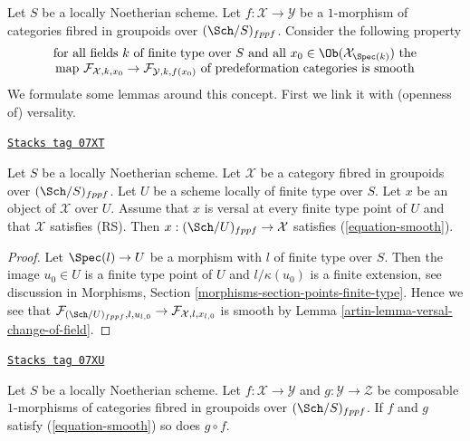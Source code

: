 Let $S$ be a locally Noetherian scheme.
Let $f : \mathcal{X} \to \mathcal{Y}$ be a $1$-morphism of categories
fibred in groupoids over $(\Sch/S)_{fppf}$. Consider the following property
\begin{equation}
\label{equation-smooth}
\begin{matrix}
\text{for all fields }k\text{ of finite type over }S
\text{ and all }x_0 \in \Ob(\mathcal{X}_{\Spec(k)})\text{ the}\\
\text{map }
\mathcal{F}_{\mathcal{X}, k, x_0} \to \mathcal{F}_{\mathcal{Y}, k, f(x_0)}
\text{ of predeformation categories is smooth}
\end{matrix}
\end{equation}
We formulate some lemmas around this concept. First we link it with
(openness of) versality.

\begin{lemma}
\label{artin-lemma-versal-smooth}
\href{https://stacks.math.columbia.edu/tag/07XT}{\texttt{Stacks tag 07XT}}

Let $S$ be a locally Noetherian scheme. Let $\mathcal{X}$ be a category
fibred in groupoids over $(\Sch/S)_{fppf}$. Let $U$ be a scheme locally
of finite type over $S$. Let $x$ be an object of $\mathcal{X}$ over $U$.
Assume that $x$ is versal at every finite type point of $U$ and that
$\mathcal{X}$ satisfies (RS). Then $x : (\Sch/U)_{fppf} \to \mathcal{X}$
satisfies (\ref{equation-smooth}).
\end{lemma}

\begin{proof}

Let $\Spec(l) \to U$ be a morphism with $l$ of finite type over $S$.
Then the image $u_0 \in U$ is a finite type point of $U$ and
$l/\kappa(u_0)$ is a finite extension, see discussion in
Morphisms, Section \ref{morphisms-section-points-finite-type}.
Hence we see that
$\mathcal{F}_{(\Sch/U)_{fppf}, l, u_{l, 0}} \to
\mathcal{F}_{\mathcal{X}, l, x_{l, 0}}$
is smooth by Lemma \ref{artin-lemma-versal-change-of-field}.
\end{proof}

\begin{lemma}
\label{artin-lemma-composition-smooth}
\href{https://stacks.math.columbia.edu/tag/07XU}{\texttt{Stacks tag 07XU}}

Let $S$ be a locally Noetherian scheme. Let $f : \mathcal{X} \to \mathcal{Y}$
and $g : \mathcal{Y} \to \mathcal{Z}$ be composable $1$-morphisms of
categories fibred in groupoids over $(\Sch/S)_{fppf}$. If $f$ and $g$
satisfy (\ref{equation-smooth}) so does $g \circ f$.
\end{lemma}

